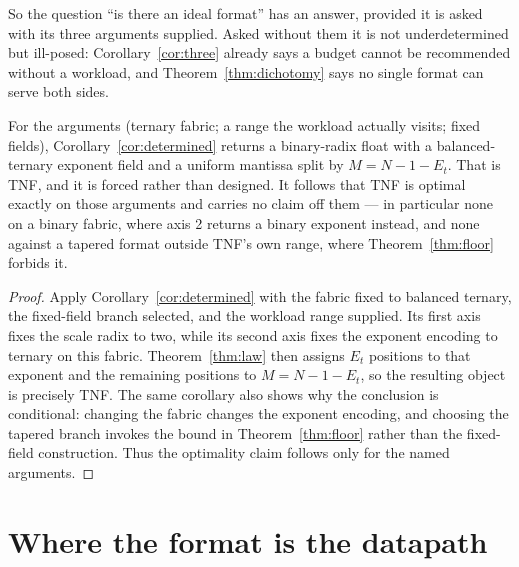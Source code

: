 So the question ``is there an ideal format'' has an answer, provided it is asked
with its three arguments supplied. Asked without them it is not underdetermined
but ill-posed: Corollary~\ref{cor:three} already says a budget cannot be
recommended without a workload, and Theorem~\ref{thm:dichotomy} says no single
format can serve both sides.

\begin{corollary}
\label{cor:whatitmakes}
For the arguments (ternary fabric; a range the workload actually visits; fixed
fields), Corollary~\ref{cor:determined} returns a binary-radix float with a
balanced-ternary exponent field and a uniform mantissa split by
$M = N - 1 - E_t$. That is TNF, and it is forced rather than designed. It follows
that TNF is optimal exactly on those arguments and carries no claim off them ---
in particular none on a binary fabric, where axis 2 returns a binary exponent
instead, and none against a tapered format outside TNF's own range, where
Theorem~\ref{thm:floor} forbids it.
\end{corollary}
\begin{proof}
Apply Corollary~\ref{cor:determined} with the fabric fixed to balanced ternary,
the fixed-field branch selected, and the workload range supplied. Its first
axis fixes the scale radix to two, while its second axis fixes the exponent
encoding to ternary on this fabric. Theorem~\ref{thm:law} then assigns
$E_t$ positions to that exponent and the remaining positions to
$M=N-1-E_t$, so the resulting object is precisely TNF. The same corollary
also shows why the conclusion is conditional: changing the fabric changes the
exponent encoding, and choosing the tapered branch invokes the bound in
Theorem~\ref{thm:floor} rather than the fixed-field construction. Thus the
optimality claim follows only for the named arguments.
\end{proof}



\section{Where the format is the datapath}\label{sec:ternarynet}



